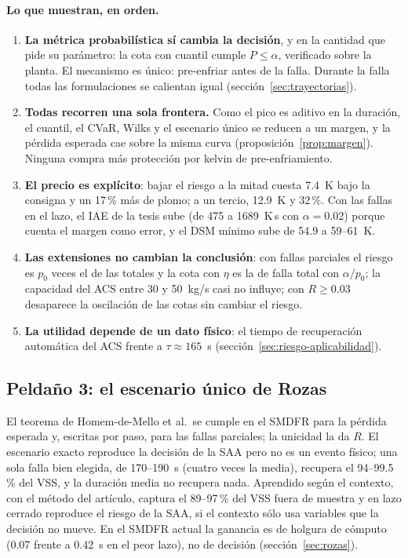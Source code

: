 \paragraph{Lo que muestran, en orden.}
\begin{enumerate}
  \item \textbf{La métrica probabilística sí cambia la decisión}, y en la cantidad que pide su
        parámetro: la cota con cuantil cumple $P\le\alpha$, verificado sobre la planta. El
        mecanismo es único: pre-enfriar antes de la falla. Durante la falla todas las formulaciones
        se calientan igual (sección~\ref{sec:trayectorias}).
  \item \textbf{Todas recorren una sola frontera.} Como el pico es aditivo en la duración, el
        cuantil, el CVaR, Wilks y el escenario único se reducen a un margen, y la pérdida esperada
        cae sobre la misma curva (proposición~\ref{prop:margen}). Ninguna compra más protección por
        kelvin de pre-enfriamiento.
  \item \textbf{El precio es explícito}: bajar el riesgo a la mitad cuesta 7.4~K bajo la consigna
        y un 17\,\% más de plomo; a un tercio, 12.9~K y 32\,\%. Con las fallas en el lazo, el IAE
        de la tesis sube (de 475 a 1689~K\,s con $\alpha=0.02$) porque cuenta el margen como error,
        y el DSM mínimo sube de 54.9 a 59--61~K.
  \item \textbf{Las extensiones no cambian la conclusión}: con fallas parciales el riesgo es $p_0$
        veces el de las totales y la cota con $\eta$ es la de falla total con $\alpha/p_0$; la
        capacidad del ACS entre 30 y 50~kg/s casi no influye; con $R\ge0.03$ desaparece la oscilación
        de las cotas sin cambiar el riesgo.
  \item \textbf{La utilidad depende de un dato físico}: el tiempo de recuperación automática del
        ACS frente a $\tau\approx165$~s (sección~\ref{sec:riesgo-aplicabilidad}).
\end{enumerate}

\subsection{Peldaño 3: el escenario único de Rozas}
El teorema de Homem-de-Mello et al.\ se cumple en el SMDFR para la pérdida esperada y, escritas
por paso, para las fallas parciales; la unicidad la da $R$. El escenario exacto reproduce la
decisión de la SAA pero no es un evento físico; una sola falla bien elegida, de 170--190~s (cuatro
veces la media), recupera el 94--99.5\,\% del VSS, y la duración media no recupera nada. Aprendido
según el contexto, con el método del artículo, captura el 89--97\,\% del VSS fuera de muestra y
en lazo cerrado reproduce el riesgo de la SAA, si el contexto sólo usa variables que la decisión no
mueve. En el SMDFR actual la ganancia es de holgura de cómputo (0.07 frente a 0.42~s en el peor
lazo), no de decisión (sección~\ref{sec:rozas}).

